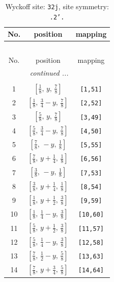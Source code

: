 \documentclass[fleqn,8pt]{jsarticle}
\begin{document}
\begin{longtable}{ccc}
\caption{Wyckoff site: {\tt 32j}, site symmetry: {\tt .2'.}}
 \\
 \hline \hline
No. & position & mapping \\ \hline \endfirsthead

\multicolumn{2}{l}{\tablename\ \thetable{}} \\
 \hline \hline
No. & position & mapping \\ \hline \endhead

 \hline \hline
\multicolumn{2}{r}{\footnotesize\it continued ...} \\ \endfoot

 \hline \hline
\multicolumn{2}{r}{} \\ \endlastfoot

1 & $\left[ \frac{1}{8},\, y,\, \frac{7}{8} \right]$ & {\tt [1,51]} \\ \hline
2 & $\left[ \frac{1}{8},\, \frac{3}{4} - y,\, \frac{7}{8} \right]$ & {\tt [2,52]} \\ \hline
3 & $\left[ \frac{5}{8},\, y,\, \frac{7}{8} \right]$ & {\tt [3,49]} \\ \hline
4 & $\left[ \frac{5}{8},\, \frac{3}{4} - y,\, \frac{7}{8} \right]$ & {\tt [4,50]} \\ \hline
5 & $\left[ \frac{7}{8},\, - y,\, \frac{1}{8} \right]$ & {\tt [5,55]} \\ \hline
6 & $\left[ \frac{7}{8},\, y + \frac{1}{4},\, \frac{1}{8} \right]$ & {\tt [6,56]} \\ \hline
7 & $\left[ \frac{3}{8},\, - y,\, \frac{1}{8} \right]$ & {\tt [7,53]} \\ \hline
8 & $\left[ \frac{3}{8},\, y + \frac{1}{4},\, \frac{1}{8} \right]$ & {\tt [8,54]} \\ \hline
9 & $\left[ \frac{1}{8},\, y + \frac{1}{2},\, \frac{3}{8} \right]$ & {\tt [9,59]} \\ \hline
10 & $\left[ \frac{1}{8},\, \frac{1}{4} - y,\, \frac{3}{8} \right]$ & {\tt [10,60]} \\ \hline
11 & $\left[ \frac{5}{8},\, y + \frac{1}{2},\, \frac{3}{8} \right]$ & {\tt [11,57]} \\ \hline
12 & $\left[ \frac{5}{8},\, \frac{1}{4} - y,\, \frac{3}{8} \right]$ & {\tt [12,58]} \\ \hline
13 & $\left[ \frac{7}{8},\, \frac{1}{2} - y,\, \frac{5}{8} \right]$ & {\tt [13,63]} \\ \hline
14 & $\left[ \frac{7}{8},\, y + \frac{3}{4},\, \frac{5}{8} \right]$ & {\tt [14,64]} \\ \hline

\end{longtable}
\end{document}
